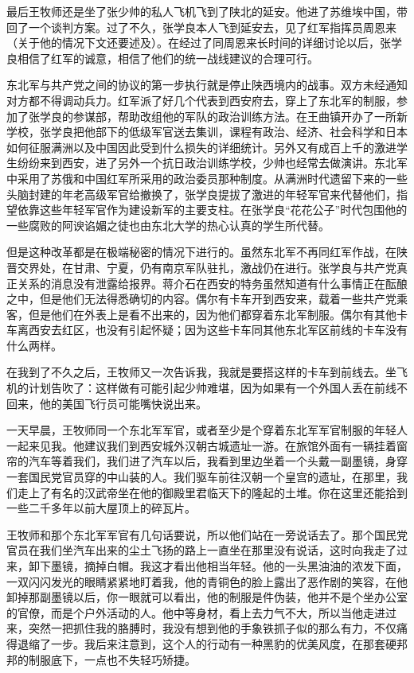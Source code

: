 \documentclass[10pt]{book}
\begin{document}
最后王牧师还是坐了张少帅的私人飞机飞到了陕北的延安。他进了苏维埃中国，带回了一个谈判方案。过了不久，张学良本人飞到延安去，见了红军指挥员周恩来（关于他的情况下文还要述及）。在经过了同周恩来长时间的详细讨论以后，张学良相信了红军的诚意，相信了他们的统一战线建议的合理可行。

东北军与共产党之间的协议的第一步执行就是停止陕西境内的战事。双方未经通知对方都不得调动兵力。红军派了好几个代表到西安府去，穿上了东北军的制服，参加了张学良的参谋部，帮助改组他的军队的政治训练方法。在王曲镇开办了一所新学校，张学良把他部下的低级军官送去集训，课程有政治、经济、社会科学和日本如何征服满洲以及中国因此受到什么损失的详细统计。另外又有成百上千的激进学生纷纷来到西安，进了另外一个抗日政治训练学校，少帅也经常去做演讲。东北军中采用了苏俄和中国红军所采用的政治委员那种制度。从满洲时代遗留下来的一些头脑封建的年老高级军官给撤换了，张学良提拔了激进的年轻军官来代替他们，指望依靠这些年轻军官作为建设新军的主要支柱。在张学良“花花公子”时代包围他的一些腐败的阿谀谄媚之徒也由东北大学的热心认真的学生所代替。

但是这种改革都是在极端秘密的情况下进行的。虽然东北军不再同红军作战，在陕晋交界处，在甘肃、宁夏，仍有南京军队驻扎，激战仍在进行。张学良与共产党真正关系的消息没有泄露给报界。蒋介石在西安的特务虽然知道有什么事情正在酝酿之中，但是他们无法得悉确切的内容。偶尔有卡车开到西安来，载着一些共产党乘客，但是他们在外表上是看不出来的，因为他们都穿着东北军制服。偶尔有其他卡车离西安去红区，也没有引起怀疑；因为这些卡车同其他东北军区前线的卡车没有什么两样。

在我到了不久之后，王牧师又一次告诉我，我就是要搭这样的卡车到前线去。坐飞机的计划告吹了：这样做有可能引起少帅难堪，因为如果有一个外国人丢在前线不回来，他的美国飞行员可能嘴快说出来。

一天早晨，王牧师同一个东北军军官，或者至少是个穿着东北军军官制服的年轻人一起来见我。他建议我们到西安城外汉朝古城遗址一游。在旅馆外面有一辆挂着窗帘的汽车等着我们，我们进了汽车以后，我看到里边坐着一个头戴一副墨镜，身穿一套国民党官员穿的中山装的人。我们驱车前往汉朝一个皇宫的遗址，在那里，我们走上了有名的汉武帝坐在他的御殿里君临天下的隆起的土堆。你在这里还能拾到一些二千多年以前大屋顶上的碎瓦片。

王牧师和那个东北军军官有几句话要说，所以他们站在一旁说话去了。那个国民党官员在我们坐汽车出来的尘土飞扬的路上一直坐在那里没有说话，这时向我走了过来，卸下墨镜，摘掉白帽。我这才看出他相当年轻。他的一头黑油油的浓发下面，一双闪闪发光的眼睛紧紧地盯着我，他的青铜色的脸上露出了恶作剧的笑容，在他卸掉那副墨镜以后，你一眼就可以看出，他的制服是件伪装，他并不是个坐办公室的官僚，而是个户外活动的人。他中等身材，看上去力气不大，所以当他走进过来，突然一把抓住我的胳膊时，我没有想到他的手象铁抓子似的那么有力，不仅痛得退缩了一步。我后来注意到，这个人的行动有一种黑豹的优美风度，在那套硬邦邦的制服底下，一点也不失轻巧矫捷。
\end{document}

